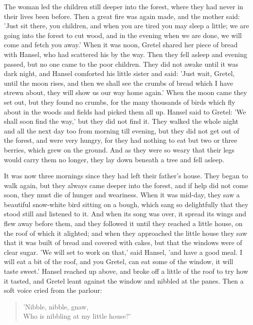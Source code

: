 \documentclass[12pt]{book}
\begin{document}
The woman led the children still deeper into the forest, where they
had never in their lives been before. Then a great fire was again
made, and the mother said: 'Just sit there, you children, and when you
are tired you may sleep a little; we are going into the forest to cut
wood, and in the evening when we are done, we will come and fetch you
away.' When it was noon, Gretel shared her piece of bread with Hansel,
who had scattered his by the way. Then they fell asleep and evening
passed, but no one came to the poor children. They did not awake until
it was dark night, and Hansel comforted his little sister and said:
'Just wait, Gretel, until the moon rises, and then we shall see the
crumbs of bread which I have strewn about, they will show us our way
home again.' When the moon came they set out, but they found no
crumbs, for the many thousands of birds which fly about in the woods
and fields had picked them all up. Hansel said to Gretel: 'We shall
soon find the way,' but they did not find it. They walked the whole
night and all the next day too from morning till evening, but they did
not get out of the forest, and were very hungry, for they had nothing
to eat but two or three berries, which grew on the ground. And as they
were so weary that their legs would carry them no longer, they lay
down beneath a tree and fell asleep.

It was now three mornings since they had left their father's house.
They began to walk again, but they always came deeper into the forest,
and if help did not come soon, they must die of hunger and weariness.
When it was mid-day, they saw a beautiful snow-white bird sitting on a
bough, which sang so delightfully that they stood still and listened
to it. And when its song was over, it spread its wings and flew away
before them, and they followed it until they reached a little house,
on the roof of which it alighted; and when they approached the little
house they saw that it was built of bread and covered with cakes, but
that the windows were of clear sugar. 'We will set to work on that,'
said Hansel, 'and have a good meal. I will eat a bit of the roof, and
you Gretel, can eat some of the window, it will taste sweet.' Hansel
reached up above, and broke off a little of the roof to try how it
tasted, and Gretel leant against the window and nibbled at the panes.
Then a soft voice cried from the parlour:

\begin{verse}
 'Nibble, nibble, gnaw,\\
  Who is nibbling at my little house?'
\end{verse}
\end{document}
